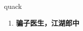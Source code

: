 
\begin{frame}
{\huge quack}
\begin{center}
\begin{enumerate}\Large
  \item \textbf{骗子医生，江湖郎中}
\end{enumerate}
\end{center}
\end{frame}
